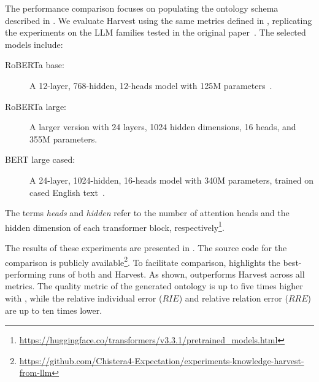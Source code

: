 The performance comparison focuses on populating the ontology schema described in .
%
We evaluate Harvest using the same metrics defined in , replicating the experiments on the \gls{LLM} families tested in the original paper~\cite{HaoTTNSZXH23}.
%
The selected models include:
%
\begin{description}
    \item[RoBERTa base:] A 12-layer, 768-hidden, 12-heads model with 125M parameters~\cite{roberta-2019}.
    \item[RoBERTa large:] A larger version with 24 layers, 1024 hidden dimensions, 16 heads, and 355M parameters.
    \item[BERT large cased:] A 24-layer, 1024-hidden, 16-heads model with 340M parameters, trained on cased English text~\cite{bert-2019}.
\end{description}
%
The terms \emph{heads} and \emph{hidden} refer to the number of attention heads and the hidden dimension of each transformer block, respectively\footnote{\url{https://huggingface.co/transformers/v3.3.1/pretrained_models.html}}.

The results of these experiments are presented in .
%
The source code for the comparison is publicly available\footnote{\url{https://github.com/Chistera4-Expectation/experiments-knowledge-harvest-from-llm}}.
%
To facilitate comparison,  highlights the best-performing runs of both \llmfkg{} and Harvest.
%
As shown, \llmfkg{} outperforms Harvest across all metrics.
%
The quality metric of the generated ontology is up to five times higher with \llmfkg{}, while the relative individual error (\(RIE\)) and relative relation error (\(RRE\)) are up to ten times lower.

